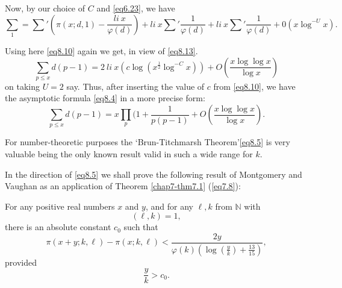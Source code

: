 Now, by our choice of $C$ and \eqref{eq6.23}, we have
\begin{equation*}
\sum_1 = \sum' (\pi (x;d,1)- \frac{li~x}{\varphi (d)}) + li~x \sum
'\frac{1}{\varphi (d)} + li~x \sum '\frac{1}{\varphi (d)} + 0 (x
\log^{-U} x). \tag{8.14}\label{eq8.14} 
\end{equation*}

Using here \eqref{eq8.10} again we get, in view of \eqref{eq8.13}.
\begin{equation*}
\sum_{p \leq x} d(p-1) = 2 ~ li ~ x (c \log (x^\frac{1}{2}
\log^{-C}x)) + O(\frac{x \log \log x}{\log x}) \tag{8.15}\label{eq8.15} 
\end{equation*}
on taking $U=2$ say. Thus, after inserting the value of $c$ from
\eqref{eq8.10}, we have the asymptotic formula \eqref{eq8.4} in a more
precise form: 
\begin{equation*}
\sum_{p \leq x} d(p - 1) = x \prod_p (1 + \frac{1}{p(p-1)} + O(\frac{x
  \log \log x}{\log x}). \tag{8.16}\label{eq8.16} 
\end{equation*}

For number-theoretic purposes the `Brun-Titchmarsh Theorem'\break \eqref{eq8.5} is
very valuable being the only known result valid in such a wide range
for $k$. 

In the direction of \eqref{eq8.5} we shall prove the following result
of Montgomery and Vaughan \cite{key2} as an application of Theorem
\ref{chap7-thm7.1} (\eqref{eq7.8}):
 
\setcounter{section}{8}
\setcounter{theorem}{0}
\begin{theorem}\label{chap8-thm8.1}%
For any positive real numbers $x$ and $y$, and for any $\ell ,k$ from
$\mathbb{N}$ with 
\begin{equation*}
(\ell ,k)=1, \tag{8.17}\label{eq8.17}
\end{equation*}
there is an absolute constant $c_0$ such that
\begin{equation*}
\pi (x + y ; k, \ell) -\pi (x; k, \ell) < \frac{2y}{\varphi (k)(\log
  (\frac{y}{k}) + \frac{13}{15})}, \tag{8.18}\label{eq8.18} 
\end{equation*}
provided
\begin{equation*}
\frac{y}{k} > c_0. \tag{8.19}\label{eq8.19}
\end{equation*}
\end{theorem}


